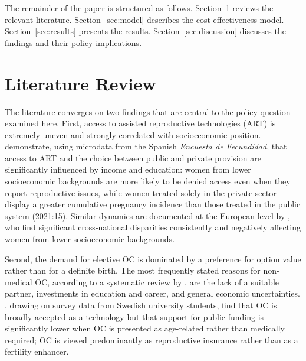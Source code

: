 \documentclass[12pt,a4paper]{article}
\begin{document}
The remainder of the paper is structured as follows.
Section~\ref{sec:literature} reviews the relevant literature.
Section~\ref{sec:model} describes the cost-effectiveness model.
Section~\ref{sec:results} presents the results.
Section~\ref{sec:discussion} discusses the findings and their policy
implications.

\section{Literature Review}\label{sec:literature}

The literature converges on two findings that are central to the policy
question examined here. First, access to assisted reproductive
technologies (ART) is extremely uneven and strongly correlated with
socioeconomic position. \citet{alonpinilla2021} demonstrate, using
microdata from the Spanish \emph{Encuesta de Fecundidad}, that access
to ART and the choice between public and private provision are
significantly influenced by income and education: women from lower
socioeconomic backgrounds are more likely to be denied access even when
they report reproductive issues, while women treated solely in the
private sector display a greater cumulative pregnancy incidence than
those treated in the public system (2021:15). Similar dynamics are
documented at the European level by \citet{seiz2023}, who find
significant cross-national disparities consistently and negatively
affecting women from lower socioeconomic backgrounds.

Second, the demand for elective OC is dominated by a preference for
option value rather than for a definite birth. The most frequently
stated reasons for non-medical OC, according to a systematic review by
\citet{kynigopoulou2024}, are the lack of a suitable partner,
investments in education and career, and general economic
uncertainties. \citet{gambadauro2023}, drawing on survey data from
Swedish university students, find that OC is broadly accepted as a
technology but that support for public funding is significantly lower
when OC is presented as age-related rather than medically required; OC
is viewed predominantly as reproductive insurance rather than as a
fertility enhancer.
\end{document}
